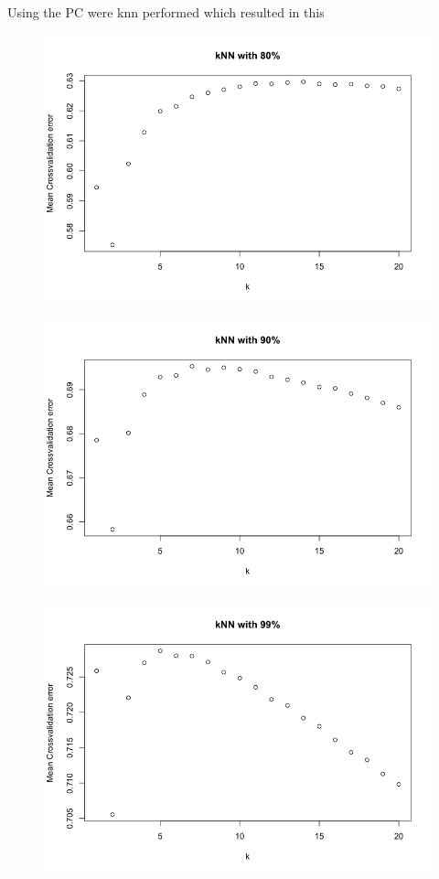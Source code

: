 Using the PC were knn performed which resulted in this

\begin{figure}[H]
\centering
\includegraphics[width = \textwidth]{graphics/kNN_plot_80.png}
\label{fig:knnFit_80}
\end{figure}


\begin{figure}[H]
\centering
\includegraphics[width = \textwidth]{graphics/kNN_plot_90.png}
\label{fig:knnFit_90}
\end{figure}


\begin{figure}[H]
\centering
\includegraphics[width = \textwidth]{graphics/kNN_plot_99.png}
\label{fig:knnFit_99}
\end{figure}






